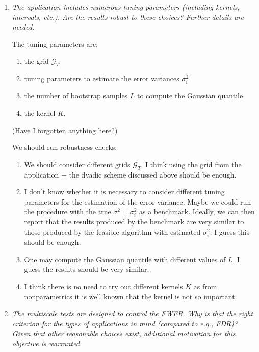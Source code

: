 \documentclass[a4paper,12pt]{article}
\begin{document}
\begin{enumerate}[label=\arabic*.,leftmargin=0.6cm]
  
\item \textit{The application includes numerous tuning parameters (including kernels, intervals, etc.). Are the results robust to these choices? Further details are needed.}

{\color{blue}  
The tuning parameters are:
\begin{enumerate}[label=(\alph*),leftmargin=0.75cm,itemsep=0pt,topsep=0pt]
\item the grid $\mathcal{G}_T$
\item tuning parameters to estimate the error variances $\sigma_i^2$ 
\item the number of bootstrap samples $L$ to compute the Gaussian quantile
\item the kernel $K$.
\end{enumerate}
(Have I forgotten anything here?)
  
We should run robustness checks:
\begin{enumerate}[label=(\alph*),leftmargin=0.75cm,itemsep=0pt,topsep=0pt]
\item We should consider different grids $\mathcal{G}_T$. I think using the grid from the application + the dyadic scheme discussed above should be enough. 
\item I don't know whether it is necessary to consider different tuning parameters for the estimation of the error variance. Maybe we could run the procedure with the true $\sigma^2 = \sigma_i^2$ as a benchmark. Ideally, we can then report that the results produced by the benchmark are very similar to those produced by the feasible algorithm with estimated $\sigma_i^2$. I guess this should be enough.
\item One may compute the Gaussian quantile with different values of $L$. I guess the results should be very similar.  
\item I think there is no need to try out different kernels $K$ as from nonparametrics it is well known that the kernel is not so important.
\end{enumerate}
}
  
  
\item \textit{The multiscale tests are designed to control the FWER. Why is that the right criterion for the types of applications in mind (compared to e.g., FDR)? Given that other reasonable choices exist, additional motivation for this objective is warranted.}



\end{enumerate}
\end{document}
